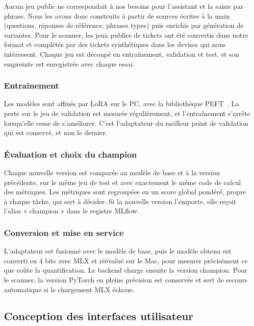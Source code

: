 Aucun jeu public ne correspondait à nos besoins pour l'assistant et la saisie par phrase.
Nous les avons donc construits à partir de sources écrites à la main (questions, réponses
de référence, phrases types) puis enrichis par génération de variantes. Pour le scanner, les
jeux publics de tickets ont été convertis dans notre format et complétés par des tickets
synthétiques dans les devises qui nous intéressent. Chaque jeu est découpé en
entraînement, validation et test, et son empreinte est enregistrée avec chaque essai.

\subsubsection{Entraînement}

Les modèles sont affinés par LoRA sur le PC, avec la bibliothèque PEFT~\cite{peft}. La
perte sur le jeu de validation est mesurée régulièrement, et l'entraînement s'arrête
lorsqu'elle cesse de s'améliorer. C'est l'adaptateur du meilleur point de validation qui est
conservé, et non le dernier.

\subsubsection{Évaluation et choix du champion}

Chaque nouvelle version est comparée au modèle de base et à la version précédente, sur le
même jeu de test et avec exactement le même code de calcul des métriques. Les métriques sont
regroupées en un score global pondéré, propre à chaque tâche, qui sert à décider. Si la
nouvelle version l'emporte, elle reçoit l'alias « champion » dans le registre MLflow.

\subsubsection{Conversion et mise en service}

L'adaptateur est fusionné avec le modèle de base, puis le modèle obtenu est converti en
4 bits avec MLX et réévalué sur le Mac, pour mesurer précisément ce que coûte la
quantification. Le backend charge ensuite la version champion. Pour le scanner, la version
PyTorch en pleine précision est conservée et sert de secours automatique si le chargement
MLX échoue.

\subsection{Conception des interfaces utilisateur}

